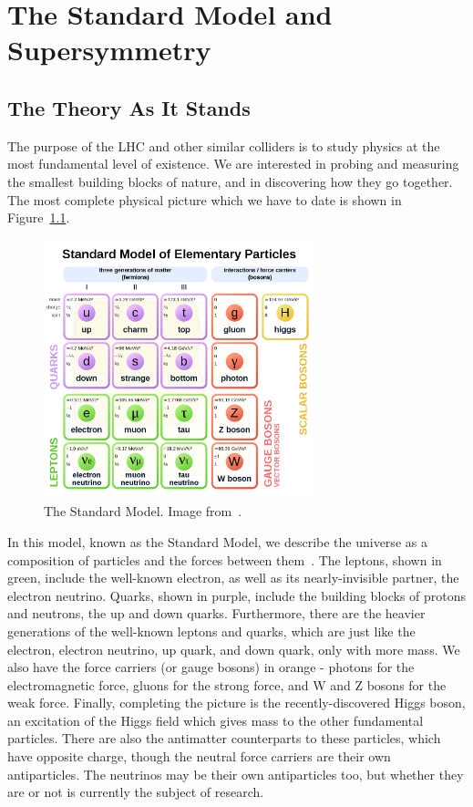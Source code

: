 \chapter{The Standard Model and Supersymmetry}\label{chap:SM_SUSY}

\section{The Theory As It Stands}

The purpose of the LHC and other similar colliders is to study physics at the most fundamental level of existence. We are interested in probing and measuring the smallest building blocks of nature, and in discovering how they go together. The most complete physical picture which we have to date is shown in Figure~\ref{fig:standard_model}.

\begin{figure}[htbp]
    \centering
    \includegraphics[width=0.7\textwidth]{Images/Background/standard_model.png}
    \caption{The Standard Model. Image from~\cite{standard_model}.}
    \label{fig:standard_model}
\end{figure}

In this model, known as the Standard Model, we describe the universe as a composition of particles and the forces between them~\cite{Griffiths}. The leptons, shown in green, include the well-known electron, as well as its nearly-invisible partner, the electron neutrino. Quarks, shown in purple, include the building blocks of protons and neutrons, the up and down quarks. Furthermore, there are the heavier generations of the well-known leptons and quarks, which are just like the electron, electron neutrino, up quark, and down quark, only with more mass. We also have the force carriers (or gauge bosons) in orange - photons for the electromagnetic force, gluons for the strong force, and W and Z bosons for the weak force. Finally, completing the picture is the recently-discovered Higgs boson, an excitation of the Higgs field which gives mass to the other fundamental particles. There are also the antimatter counterparts to these particles, which have opposite charge, though the neutral force carriers are their own antiparticles. The neutrinos may be their own antiparticles too, but whether they are or not is currently the subject of research.

